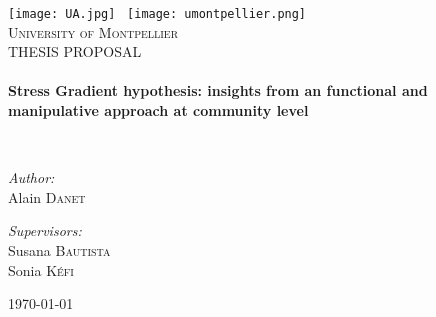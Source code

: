 \begin{titlepage}
\begin{center}

\texttt{[image: UA.jpg]}~ \hfill \texttt{[image: umontpellier.png]}~\\[1cm]

\textsc{\LARGE University of Montpellier}\\[1.5cm]

\textsc{\large THESIS PROPOSAL}\\[0.5cm]

\HRule \\[0.4cm]
{ \Large \bfseries Stress Gradient hypothesis: insights from an functional and manipulative approach at community level\\[0.4cm] }


\HRule \\[1.5cm]

\noindent
\begin{minipage}{0.4\textwidth}
\begin{flushleft} \large
\emph{Author:}\\
Alain \textsc{Danet}
\end{flushleft}
\end{minipage}%
\begin{minipage}{0.4\textwidth}
\begin{flushright} \large
\emph{Supervisors:} \\
Susana \textsc{Bautista} \\[0.0cm]
Sonia \textsc{Kéfi}
\end{flushright}
\end{minipage}

\vfill

{\large \today}

\end{center}
\end{titlepage}

